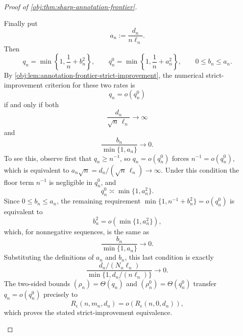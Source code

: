 \documentclass[11pt]{article}
\begin{document}
\begin{proof}[Proof of \cref{obj:thm:sharp-annotation-frontier}]
\begin{enumerate}
Finally put
\[
a_n:=\frac{d_n}{n\ell_n}.
\]
Then
\[
q_n=\min\left\{1,\frac1n+b_n^2\right\},
\qquad
q_n^{0}=\min\left\{1,\frac1n+a_n^2\right\},
\qquad
0\le b_n\le a_n .
\]
By \cref{obj:lem:annotation-frontier-strict-improvement}, the numerical strict-improvement
criterion for these two rates is
\[
q_n=o(q_n^{0})
\]
if and only if both
\[
\frac{d_n}{\sqrt n\,\ell_n}\to\infty
\]
and
\[
\frac{b_n}{\min\{1,a_n\}}\to0.
\]
To see this, observe first that \(q_n\ge n^{-1}\), so \(q_n=o(q_n^{0})\) forces
\(n^{-1}=o(q_n^{0})\), which is equivalent to
\(a_n\sqrt n=d_n/(\sqrt n\,\ell_n)\to\infty\).  Under this condition the floor term \(n^{-1}\) is negligible in \(q_n^{0}\), and
\[
q_n^{0}\asymp \min\{1,a_n^2\}.
\]
Since \(0\le b_n\le a_n\), the remaining requirement
\(\min\{1,n^{-1}+b_n^2\}=o(q_n^{0})\) is equivalent to
\[
b_n^2=o(\min\{1,a_n^2\}),
\]
which, for nonnegative sequences, is the same as
\[
\frac{b_n}{\min\{1,a_n\}}\to0.
\]
Substituting the definitions of \(a_n\) and \(b_n\), this last condition is exactly
\[
\frac{d_n/(N_n\ell_n)}
{\min\{1,d_n/(n\ell_n)\}}
\to0.
\]
The two-sided bounds \((\rho_n)=\Theta(q_n)\) and \((\rho_n^{0})=\Theta(q_n^{0})\) transfer
\(q_n=o(q_n^{0})\) precisely to
\[
R_\epsilon(n,m_n,d_n)
=
o\!\left(R_\epsilon(n,0,d_n)\right),
\]
which proves the stated strict-improvement equivalence. %
\end{enumerate}
\end{proof}
\end{document}
